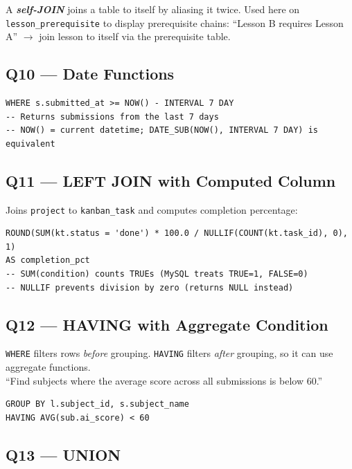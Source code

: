 \documentclass[11pt,a4paper]{article}
\newcommand{\term}[1]{\textbf{\textit{#1}}}
\newcommand{\T}[1]{\texttt{#1}}          %
\begin{document}
\begin{defbox}
A \term{self-JOIN} joins a table to itself by aliasing it twice.
Used here on \T{lesson\_prerequisite} to display prerequisite chains:
``Lesson B requires Lesson A'' $\to$ join lesson to itself via the prerequisite table.
\end{defbox}

\subsection{Q10 — Date Functions}

\begin{lstlisting}[style=sql]
WHERE s.submitted_at >= NOW() - INTERVAL 7 DAY
-- Returns submissions from the last 7 days
-- NOW() = current datetime; DATE_SUB(NOW(), INTERVAL 7 DAY) is equivalent
\end{lstlisting}

\subsection{Q11 — LEFT JOIN with Computed Column}

Joins \T{project} to \T{kanban\_task} and computes completion percentage:
\begin{lstlisting}[style=sql]
ROUND(SUM(kt.status = 'done') * 100.0 / NULLIF(COUNT(kt.task_id), 0), 1)
AS completion_pct
-- SUM(condition) counts TRUEs (MySQL treats TRUE=1, FALSE=0)
-- NULLIF prevents division by zero (returns NULL instead)
\end{lstlisting}

\subsection{Q12 — HAVING with Aggregate Condition}

\begin{defbox}
\T{WHERE} filters rows \textit{before} grouping. \T{HAVING} filters \textit{after}
grouping, so it can use aggregate functions.\\
``Find subjects where the average score across all submissions is below 60.''
\end{defbox}

\begin{lstlisting}[style=sql]
GROUP BY l.subject_id, s.subject_name
HAVING AVG(sub.ai_score) < 60
\end{lstlisting}

\subsection{Q13 — UNION}
\end{document}
